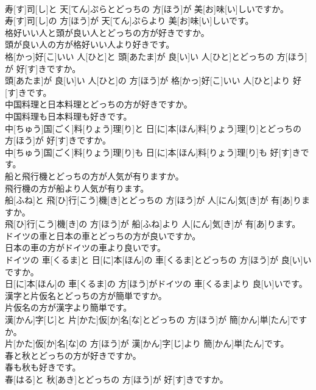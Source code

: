 \documentclass[8pt]{extreport}
\begin{document}
\begin{CJK}{UTF8}{min}
\\	寿[す]司[し]と 天[てん]ぷらとどっちの 方[ほう]が 美[お]味[い]しいですか。 
\\	寿[す]司[し]の 方[ほう]が 天[てん]ぷらより 美[お]味[い]しいです。
\\	格好いい人と頭が良い人とどっちの方が好きですか。 
\\	頭が良い人の方が格好いい人より好きです。	
\\	格[かっ]好[こ]いい 人[ひと]と 頭[あたま]が 良[い]い 人[ひと]とどっちの 方[ほう]が 好[す]きですか。 
\\	頭[あたま]が 良[い]い 人[ひと]の 方[ほう]が 格[かっ]好[こ]いい 人[ひと]より 好[す]きです。
\\	中国料理と日本料理とどっちの方が好きですか。 
\\	中国料理も日本料理も好きです。	
\\	中[ちゅう]国[ごく]料[りょう]理[り]と 日[に]本[ほん]料[りょう]理[り]とどっちの 方[ほう]が 好[す]きですか。 
\\	中[ちゅう]国[ごく]料[りょう]理[り]も 日[に]本[ほん]料[りょう]理[り]も 好[す]きです。
\\	船と飛行機とどっちの方が人気が有りますか。 
\\	飛行機の方が船より人気が有ります。	
\\	船[ふね]と 飛[ひ]行[こう]機[き]とどっちの 方[ほう]が 人[にん]気[き]が 有[あ]りますか。 
\\	飛[ひ]行[こう]機[き]の 方[ほう]が 船[ふね]より 人[にん]気[き]が 有[あ]ります。
\\	ドイツの車と日本の車とどっちの方が良いですか。 
\\	日本の車の方がドイツの車より良いです。	
\\	ドイツの 車[くるま]と 日[に]本[ほん]の 車[くるま]とどっちの 方[ほう]が 良[い]いですか。 
\\	日[に]本[ほん]の 車[くるま]の 方[ほう]がドイツの 車[くるま]より 良[い]いです。
\\	漢字と片仮名とどっちの方が簡単ですか。 
\\	片仮名の方が漢字より簡単です。	
\\	漢[かん]字[じ]と 片[かた]仮[か]名[な]とどっちの 方[ほう]が 簡[かん]単[たん]ですか。 
\\	片[かた]仮[か]名[な]の 方[ほう]が 漢[かん]字[じ]より 簡[かん]単[たん]です。
\\	春と秋とどっちの方が好きですか。 
\\	春も秋も好きです。	
\\	春[はる]と 秋[あき]とどっちの 方[ほう]が 好[す]きですか。 

\end{CJK}
\end{document}
